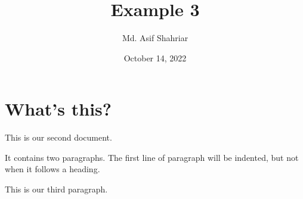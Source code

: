 \documentclass[a4paper, 11pt]{article}
\begin{document}
\title{Example 3}
\author{Md. Asif Shahriar}
\date{October 14, 2022}
\maketitle
\section{What's this?}
    This is our 
    second document.

    It contains two paragraphs. The first line of
    paragraph will be indented, but not when it follows
    a heading. 

    This is our third paragraph. 
\end{document}
